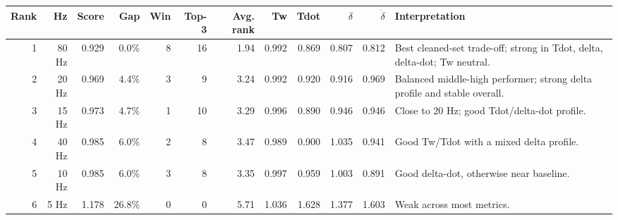 \begin{tabular}{r r r r r r r r r r r l}
\hline
Rank & Hz & Score & Gap & Win & Top-3 & Avg. rank & Tw & Tdot & $\delta$ & $\dot{\delta}$ & Interpretation \\
\hline
1 & 80 Hz & 0.929 & 0.0\% & 8 & 16 & 1.94 & 0.992 & 0.869 & 0.807 & 0.812 & Best cleaned-set trade-off; strong in Tdot, delta, delta-dot; Tw neutral. \\
2 & 20 Hz & 0.969 & 4.4\% & 3 & 9 & 3.24 & 0.992 & 0.920 & 0.916 & 0.969 & Balanced middle-high performer; strong delta profile and stable overall. \\
3 & 15 Hz & 0.973 & 4.7\% & 1 & 10 & 3.29 & 0.996 & 0.890 & 0.946 & 0.946 & Close to 20 Hz; good Tdot/delta-dot profile. \\
4 & 40 Hz & 0.985 & 6.0\% & 2 & 8 & 3.47 & 0.989 & 0.900 & 1.035 & 0.941 & Good Tw/Tdot with a mixed delta profile. \\
5 & 10 Hz & 0.985 & 6.0\% & 3 & 8 & 3.35 & 0.997 & 0.959 & 1.003 & 0.891 & Good delta-dot, otherwise near baseline. \\
6 & 5 Hz & 1.178 & 26.8\% & 0 & 0 & 5.71 & 1.036 & 1.628 & 1.377 & 1.603 & Weak across most metrics. \\
\hline
\end{tabular}

